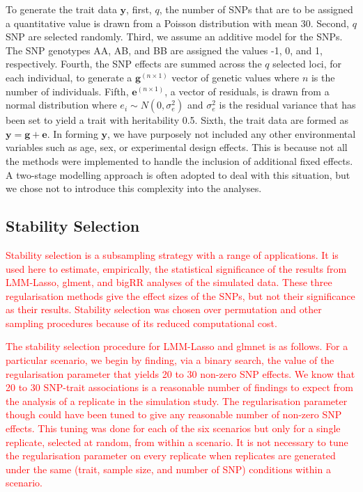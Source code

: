 \documentclass{bioinfo}
\newcommand{\by}{\bm{y}}
\begin{document}
To generate the trait data $\by$, first, $q$, the number of SNPs that are to be assigned a quantitative value is drawn from a Poisson distribution with 
mean 30. Second, $q$ SNP are selected randomly. Third, we assume an additive model for the SNPs. The SNP genotypes AA, AB, and BB 
are assigned the values -1, 0, and 1, respectively. Fourth, the SNP effects are summed across the $q$ selected loci, for each individual, to 
generate a $\bm{g}^{(n \times 1)}$ vector of genetic values where $n$ is the number of individuals. 
Fifth, $\bm{e}^{(n \times 1)}$, a vector of residuals, is drawn from a normal distribution where $e_i \sim N(0, \sigma^2_e)$ and $\sigma^2_e$ is 
the residual variance that has been set to yield a trait with heritability 0.5. Sixth,  the trait data are formed as $\by =  \bm{g} + \bm{e}$.  
In forming $\by$, we have purposely not included any other environmental variables such as age, sex, or experimental design effects. This is because 
not all the methods were implemented to handle the inclusion of additional fixed effects. A two-stage modelling approach 
is often adopted to deal with this situation, but we chose not to introduce this complexity into the analyses.  




\subsection{Stability Selection}

 
 \textcolor{red}{Stability selection  \citep{meinshausen2010stability}  is a subsampling strategy with a range of applications. 
 It is used here to estimate, empirically, the statistical significance of the results from LMM-Lasso, glment, and bigRR analyses 
 of the simulated data. These three regularisation methods give the effect sizes of the SNPs, but not their significance as their 
 results.   Stability selection was chosen over permutation and other sampling procedures because of its reduced computational cost. 
 }
 
 \textcolor{red}{
The stability selection procedure for LMM-Lasso and glmnet is as follows. 
For a particular scenario, we begin by finding, via a binary search,  
the value of the regularisation parameter that yields 20 to 30 non-zero SNP effects. 
We know that 20 to 30 SNP-trait associations is a reasonable number of findings to expect from the analysis of a replicate in the simulation study.  The regularisation parameter though could have been tuned to give any reasonable number of non-zero SNP effects. 
 This tuning was done for each of the six scenarios 
 but only for a single replicate, selected at random,  from within a scenario. It is not necessary to tune the regularisation parameter on every replicate 
 when replicates are generated under the same (trait, sample size, and number of SNP) conditions within a scenario. 
 }
 
\end{document}
